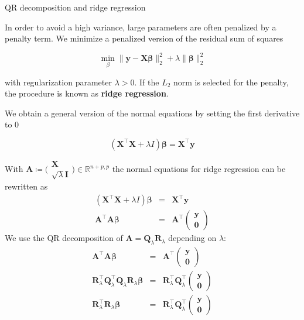 \begin{vbframe}{QR decomposition and ridge regression}

In order to avoid a high variance, large parameters are often penalized by a penalty term. We minimize a penalized version of the residual sum of squares

$$
\min_\beta \|\bm{y} - \bm{X\beta}\|_2^2 + \lambda \|\bm{\beta}\|_2^2
$$

with regularization parameter $\lambda > 0$. If the $L_2$ norm is selected for the penalty, the procedure is known as \textbf{ridge regression}.

\lz

We obtain a general version of the normal equations by setting the first derivative to $0$ 

$$
\left(\mathbf{X}^\top\mathbf{X} + \lambda I \right)\boldsymbol{\beta} = \mathbf{X}^\top\mathbf{y}
$$

\framebreak

With $\bm{A} \coloneqq \bigl( \begin{smallmatrix} \bm{X} \\ \sqrt{\lambda} \bm{I} \end{smallmatrix} \bigr) \in \mathbb{R}^{n+p,p} $  the normal equations for ridge regression can be rewritten as
\begin{eqnarray*}
\left(\mathbf{X}^\top\mathbf{X} + \lambda I \right)\boldsymbol{\beta} &=& \mathbf{X}^\top\mathbf{y} \\
\mathbf{A}^\top\mathbf{A}\boldsymbol{\beta} &=& \mathbf{A}^\top\begin{pmatrix} \mathbf{y} \\ \mathbf{0} \end{pmatrix}
\end{eqnarray*}
We use the QR decomposition of $ \bm{A} = \bm{Q}_\lambda\bm{R}_\lambda $ depending on $\lambda$:
\begin{eqnarray*}
\mathbf{A}^\top\mathbf{A}\boldsymbol{\beta} &=& \mathbf{A}^\top \begin{pmatrix} \mathbf{y} \\ \mathbf{0} \end{pmatrix} \\
\mathbf{R}_\lambda^\top \mathbf{Q}_\lambda^\top \mathbf{Q}_\lambda\mathbf{R}_\lambda\boldsymbol{\beta} &=& \mathbf{R}_\lambda^\top\mathbf{Q}_\lambda^\top \begin{pmatrix} \mathbf{y} \\ \mathbf{0} \end{pmatrix} \\
\mathbf{R}_\lambda^\top\mathbf{R}_\lambda\boldsymbol{\beta} &=& \mathbf{R}_\lambda^\top\mathbf{Q}_\lambda^\top \begin{pmatrix} \mathbf{y} \\ \mathbf{0} \end{pmatrix} 
\end{eqnarray*}


\end{vbframe}
